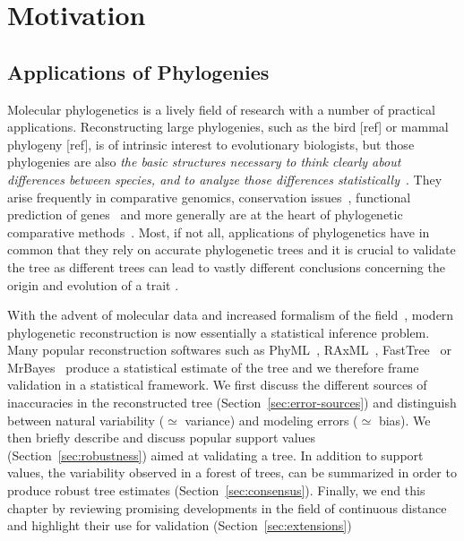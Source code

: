 \section{Motivation} \label{sec:Motivation}

\subsection{Applications of Phylogenies} \label{sec:applications}

Molecular phylogenetics is a lively field of research with a number of practical applications.
Reconstructing large phylogenies, such as the bird [ref] or mammal phylogeny [ref], is of intrinsic interest
to evolutionary biologists, but those phylogenies are also \emph{the basic structures necessary to think clearly about differences between species, and to analyze those differences statistically}~\citep{Felsenstein2004}. They arise frequently in comparative genomics, conservation issues~\citep{Bordewich2008}, functional prediction of genes~\citep{Eisen1998} and more generally are at the heart of phylogenetic comparative methods~\citep{Revell2008, Pennell2013}. Most, if not all, applications of phylogenetics have in common that they rely on accurate phylogenetic trees and it is crucial to validate the tree as different trees can lead to vastly different conclusions concerning the origin and evolution of a trait \citep{Geneva2015}.

With the advent of molecular data and increased formalism of the field~\citep{Gascuel2005a}, modern phylogenetic reconstruction is now essentially a statistical inference problem. Many popular reconstruction softwares such as PhyML~\citep{Guindon2003}, RAxML~\citep{Stamatakis2006}, FastTree~\citep{Price2010} or MrBayes~\citep{Ronquist2003} produce a statistical estimate of the tree and we therefore frame validation in a statistical framework. We first discuss the different sources of inaccuracies in the reconstructed tree (Section~\ref{sec:error-sources}) and distinguish between natural variability ($\simeq$ variance) and modeling errors ($\simeq$ bias). We then briefly describe and discuss popular support values (Section~\ref{sec:robustness}) aimed at validating a tree. In addition to support values, the variability observed in a forest of trees, can be summarized in order to produce robust tree estimates (Section~\ref{sec:consensus}). Finally, we end this chapter by reviewing promising developments in the field of continuous distance and highlight their use for validation (Section~\ref{sec:extensions})

